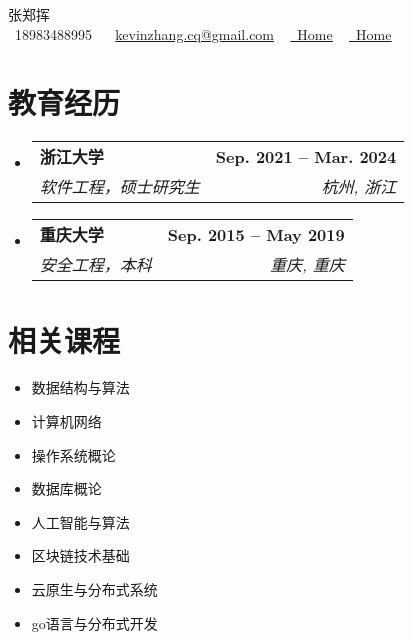\documentclass[letterpaper,11pt]{ctexart}
\makeatletter
\newcommand{\resumeSubheading}[4]{
  \vspace{-2pt}\item
    \begin{tabular*}{1.0\textwidth}[t]{l@{\extracolsep{\fill}}r}
      \textbf{#1} & \textbf{\small #2} \\
      \textit{\small#3} & \textit{\small #4} \\
    \end{tabular*}\vspace{-7pt}
}
\newcommand{\resumeSubHeadingListStart}{\begin{itemize}[leftmargin=0.0in, label={}]}
\newcommand{\resumeSubHeadingListEnd}{\end{itemize}}
\makeatother
\begin{document}

\begin{center}
    {\Huge \scshape 张郑挥} \\ \vspace{1pt}
    \vspace{1pt}
    \small \raisebox{-0.1\height}\faPhone\ 18983488995 ~ \raisebox{-0.2\height}\faEnvelope\  \underline{kevinzhang.cq@gmail.com} ~
    \href{https://linkedin.com/in/kevin-zhang-95245521b/}{\raisebox{-0.2\height}\faLinkedin\ \underline{Home}}  ~
    \href{https://github.com/kevin-zhangzh}{\raisebox{-0.2\height}\faGithub\ \underline{Home}}
    \vspace{-8pt}
\end{center}


\section{教育经历}
  \resumeSubHeadingListStart
    \resumeSubheading
      {浙江大学}{Sep. 2021 -- Mar. 2024}
      {软件工程，硕士研究生}{杭州, 浙江}
    \resumeSubheading
      {重庆大学}{Sep. 2015 -- May 2019}
      {安全工程，本科}{重庆, 重庆}
  \resumeSubHeadingListEnd

\section{相关课程}
       \begin{multicols}{4}
           \begin{itemize}[itemsep=-5pt, parsep=3pt]
               \item 数据结构与算法
               \item 计算机网络
               \item 操作系统概论
               \item 数据库概论
               \item 人工智能与算法
               \item 区块链技术基础
               \item 云原生与分布式系统
               \item go语言与分布式开发
           \end{itemize}
       \end{multicols}
       \vspace*{2.0\multicolsep}
\end{document}
